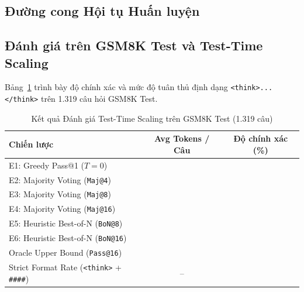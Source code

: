 \subsection{Đường cong Hội tụ Huấn luyện}

\subsection{Đánh giá trên GSM8K Test và Test-Time Scaling}
Bảng~\ref{tab:gsm8k_results} trình bày độ chính xác và mức độ tuân thủ định dạng \texttt{<think>...</think>} trên 1.319 câu hỏi GSM8K Test.

\begin{table}[htbp]
\centering
\caption{Kết quả Đánh giá Test-Time Scaling trên GSM8K Test (1.319 câu)}
\label{tab:gsm8k_results}
\begin{tabular}{@{}lcc@{}}
\toprule
\textbf{Chiến lược} & \textbf{Avg Tokens / Câu} & \textbf{Độ chính xác (\%)} \\ \midrule
E1: Greedy Pass@1 ($T=0$) & \tbd{-} & \tbd{-} \\
E2: Majority Voting (\texttt{Maj@4}) & \tbd{-} & \tbd{-} \\
E3: Majority Voting (\texttt{Maj@8}) & \tbd{-} & \tbd{-} \\
E4: Majority Voting (\texttt{Maj@16}) & \tbd{-} & \tbd{-} \\
E5: Heuristic Best-of-N (\texttt{BoN@8}) & \tbd{-} & \tbd{-} \\
E6: Heuristic Best-of-N (\texttt{BoN@16}) & \tbd{-} & \tbd{-} \\
\midrule
Oracle Upper Bound (\texttt{Pass@16}) & \tbd{-} & \tbd{-} \\
Strict Format Rate (\texttt{<think>} + \texttt{\#\#\#\#}) & -- & \tbd{-} \\ \bottomrule
\end{tabular}
\end{table}

